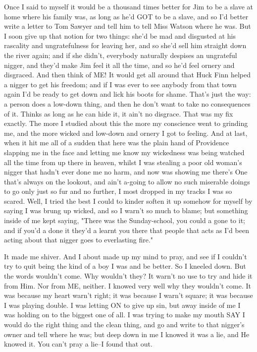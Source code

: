 Once I said to myself it would be a thousand times better for Jim to be a
slave at home where his family was, as long as he'd GOT to be a slave,
and so I'd better write a letter to Tom Sawyer and tell him to tell Miss
Watson where he was.  But I soon give up that notion for two things:
she'd be mad and disgusted at his rascality and ungratefulness for
leaving her, and so she'd sell him straight down the river again; and if
she didn't, everybody naturally despises an ungrateful nigger, and they'd
make Jim feel it all the time, and so he'd feel ornery and disgraced.
And then think of ME!  It would get all around that Huck Finn helped a
nigger to get his freedom; and if I was ever to see anybody from that
town again I'd be ready to get down and lick his boots for shame.  That's
just the way:  a person does a low-down thing, and then he don't want to
take no consequences of it. Thinks as long as he can hide it, it ain't no
disgrace.  That was my fix exactly.  The more I studied about this the
more my conscience went to grinding me, and the more wicked and low-down
and ornery I got to feeling. And at last, when it hit me all of a sudden
that here was the plain hand of Providence slapping me in the face and
letting me know my wickedness was being watched all the time from up
there in heaven, whilst I was stealing a poor old woman's nigger that
hadn't ever done me no harm, and now was showing me there's One that's
always on the lookout, and ain't a-going to allow no such miserable
doings to go only just so fur and no further, I most dropped in my tracks
I was so scared.  Well, I tried the best I could to kinder soften it up
somehow for myself by saying I was brung up wicked, and so I warn't so
much to blame; but something inside of me kept saying, "There was the
Sunday-school, you could a gone to it; and if you'd a done it they'd a
learnt you there that people that acts as I'd been acting about that
nigger goes to everlasting fire."

It made me shiver.  And I about made up my mind to pray, and see if I
couldn't try to quit being the kind of a boy I was and be better.  So I
kneeled down.  But the words wouldn't come.  Why wouldn't they?  It
warn't no use to try and hide it from Him.  Nor from ME, neither.  I
knowed very well why they wouldn't come.  It was because my heart warn't
right; it was because I warn't square; it was because I was playing
double.  I was letting ON to give up sin, but away inside of me I was
holding on to the biggest one of all.  I was trying to make my mouth SAY
I would do the right thing and the clean thing, and go and write to that
nigger's owner and tell where he was; but deep down in me I knowed it was
a lie, and He knowed it.  You can't pray a lie--I found that out.


